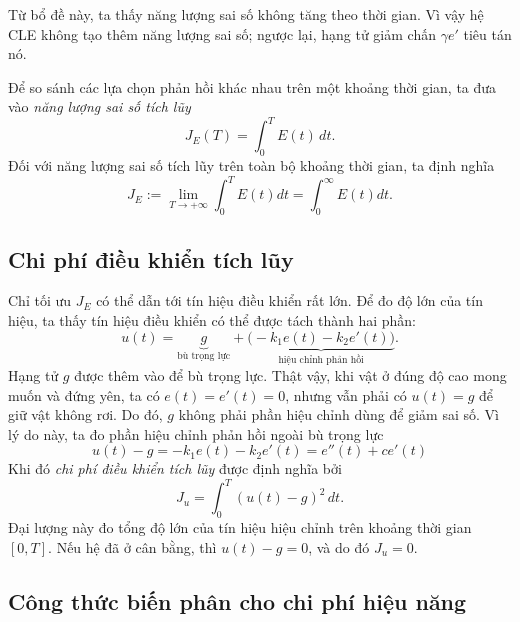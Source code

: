 ﻿\documentclass[12pt]{article}
\begin{document}
Từ bổ đề này, ta thấy năng lượng sai số không tăng theo thời gian. Vì vậy hệ CLE không tạo thêm năng lượng sai số; ngược lại, hạng tử giảm chấn $\gamma e'$ tiêu tán nó.

Để so sánh các lựa chọn phản hồi khác nhau trên một khoảng thời gian, ta đưa vào \textit{năng lượng sai số tích lũy}
\[
 J_E(T) = \int_0^T E(t)\, dt.
\]
Đối với năng lượng sai số tích lũy trên toàn bộ khoảng thời gian, ta định nghĩa
\[
 J_E:= \lim_{T \to + \infty} \int_0^T E(t)dt = \int_0^\infty E(t)dt.
\]
\subsection{Chi phí điều khiển tích lũy}
Chỉ tối ưu $J_E$  có thể dẫn tới tín hiệu điều khiển rất lớn.
Để đo độ lớn của tín hiệu, ta thấy tín hiệu điều khiển có thể được tách thành hai phần:
\[
 u(t) = \underbrace{g}_{\text{bù trọng lực}} + \underbrace{\bigl(-k_1e(t) - k_2e'(t)\bigr)}_{\text{hiệu chỉnh phản hồi}}.
\]
Hạng tử $g$ được thêm vào để bù trọng lực. Thật vậy, khi vật ở đúng độ cao mong muốn và đứng yên, ta có $e(t) = e'(t) = 0$,
nhưng vẫn phải có $u(t) = g$ để giữ vật không rơi. Do đó, $g$ không phải phần hiệu chỉnh dùng để giảm sai số. Vì lý do này, ta đo phần hiệu chỉnh phản hồi ngoài bù trọng lực
\[
 u(t) - g = -k_1e(t) - k_2e'(t) = e''(t) + ce'(t)
\]
Khi đó \textit{chi phí điều khiển tích lũy} được định nghĩa bởi
\[
 J_u = \int_0^T (u(t) - g)^2\, dt.
\]
Đại lượng này đo tổng độ lớn của tín hiệu hiệu chỉnh trên khoảng thời gian $[0, T]$. Nếu hệ đã ở cân bằng, thì $u(t) - g = 0$, và do đó $J_u = 0$.
\subsection{Công thức biến phân cho chi phí hiệu năng}\label{VF}
\end{document}
